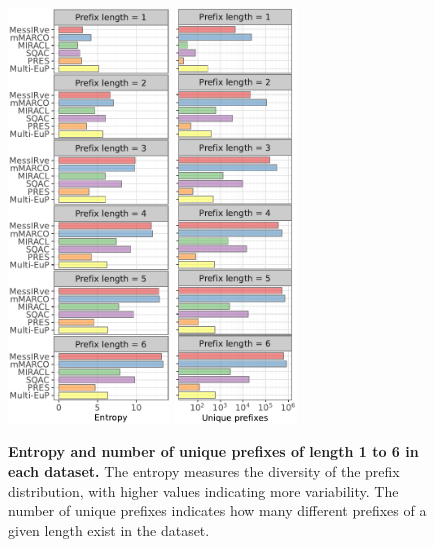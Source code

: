 \documentclass[11pt]{article}
\begin{document}
\begin{figure}[ht!]
  \centering
  \includegraphics[height=11cm]{plots/datasets_query_entropy.pdf} 
  \includegraphics[height=11cm]{plots/datasets_query_unique.pdf}
  \caption{\textbf{Entropy and number of unique prefixes of length 1 to 6 in each dataset.}
    The entropy measures the diversity of the prefix distribution, with higher values indicating more variability. The number of unique prefixes indicates how many different prefixes of a given length exist in the dataset.
  }
  \label{fig:datasets_query_entropy}
\end{figure}
\end{document}
